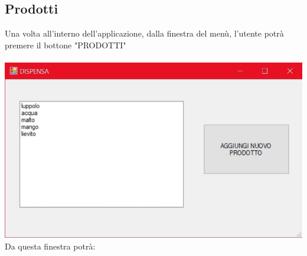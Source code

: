 \documentclass[a4paper, titlepage]{article}
\begin{document}
\subsection{Prodotti}
Una volta all'interno dell'applicazione, dalla finestra del menù, l'utente potrà premere il bottone "PRODOTTI"\\\\
\includegraphics[scale=0.30]{Immagini/form/Form GestioneProdotti.jpg}
\\Da questa finestra potrà:
\end{document}
